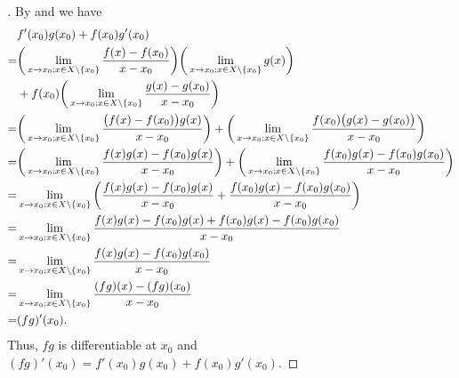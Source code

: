 \begin{proof}[]
  By  and  we have
  \begin{align*}
      & f'(x_0) g(x_0) + f(x_0) g'(x_0)                                                                                                                                                                                       \\
    = & \bigg(\lim_{x \to x_0 ; x \in X \setminus \left\lbrace x_0\right\rbrace} \dfrac{f(x) - f(x_0)}{x - x_0}\bigg) \bigg(\lim_{x \to x_0 ; x \in X \setminus \left\lbrace x_0\right\rbrace} g(x)\bigg)                                                             \\
      & + f(x_0) \bigg(\lim_{x \to x_0 ; x \in X \setminus \left\lbrace x_0\right\rbrace} \dfrac{g(x) - g(x_0)}{x - x_0}\bigg)                                                                                                                    \\
    = & \bigg(\lim_{x \to x_0 ; x \in X \setminus \left\lbrace x_0\right\rbrace} \dfrac{\big(f(x) - f(x_0)\big) g(x)}{x - x_0}\bigg) + \bigg(\lim_{x \to x_0 ; x \in X \setminus \left\lbrace x_0\right\rbrace} \dfrac{f(x_0) \big(g(x) - g(x_0)\big)}{x - x_0}\bigg) \\
    = & \bigg(\lim_{x \to x_0 ; x \in X \setminus \left\lbrace x_0\right\rbrace} \dfrac{f(x) g(x) - f(x_0) g(x)}{x - x_0}\bigg) + \bigg(\lim_{x \to x_0 ; x \in X \setminus \left\lbrace x_0\right\rbrace} \dfrac{f(x_0) g(x) - f(x_0) g(x_0)}{x - x_0}\bigg)         \\
    = & \lim_{x \to x_0 ; x \in X \setminus \left\lbrace x_0\right\rbrace} \bigg(\dfrac{f(x) g(x) - f(x_0) g(x)}{x - x_0} + \dfrac{f(x_0) g(x) - f(x_0) g(x_0)}{x - x_0}\bigg)                                                                    \\
    = & \lim_{x \to x_0 ; x \in X \setminus \left\lbrace x_0\right\rbrace} \dfrac{f(x) g(x) - f(x_0) g(x) + f(x_0) g(x) - f(x_0) g(x_0)}{x - x_0}                                                                                                 \\
    = & \lim_{x \to x_0 ; x \in X \setminus \left\lbrace x_0\right\rbrace} \dfrac{f(x) g(x) - f(x_0) g(x_0)}{x - x_0}                                                                                                                             \\
    = & \lim_{x \to x_0 ; x \in X \setminus \left\lbrace x_0\right\rbrace} \dfrac{(fg)(x) - (fg)(x_0)}{x - x_0}                                                                                                                                   \\
    = & (fg)'(x_0).
  \end{align*}
  Thus, \(fg\) is differentiable at \(x_0\) and \((fg)'(x_0) = f'(x_0) g(x_0) + f(x_0) g'(x_0)\).
\end{proof}

